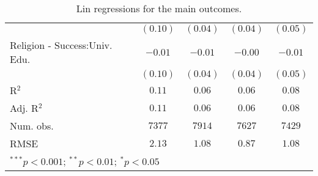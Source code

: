 \begin{table}[H]
\begin{center}
\begin{scriptsize}
\begin{tabular}{l c c c c}
                               & $(0.10)$     & $(0.04)$     & $(0.04)$     & $(0.05)$     \\
Religion - Success:Univ. Edu.  & $-0.01$      & $-0.01$      & $-0.00$      & $-0.01$      \\
                               & $(0.10)$     & $(0.04)$     & $(0.04)$     & $(0.05)$     \\
\hline
R$^2$                          & $0.11$       & $0.06$       & $0.06$       & $0.08$       \\
Adj. R$^2$                     & $0.11$       & $0.06$       & $0.06$       & $0.08$       \\
Num. obs.                      & $7377$       & $7914$       & $7627$       & $7429$       \\
RMSE                           & $2.13$       & $1.08$       & $0.87$       & $1.08$       \\
\hline
\multicolumn{5}{l}{\tiny{$^{***}p<0.001$; $^{**}p<0.01$; $^{*}p<0.05$}}
\end{tabular}
\end{scriptsize}
\caption{Lin regressions for the main outcomes.}
\label{tab:ate_lin}
\end{center}
\end{table}

